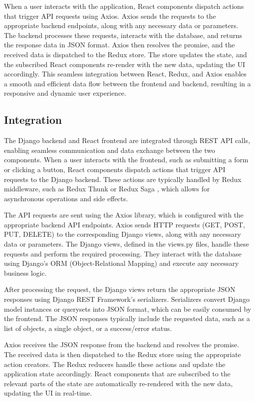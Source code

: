 \documentclass[conference]{IEEEtran}
\begin{document}
When a user interacts with the application, React components dispatch actions that trigger API requests using Axios. Axios sends the requests to the appropriate backend endpoints, along with any necessary data or parameters. The backend processes these requests, interacts with the database, and returns the response data in JSON format. Axios then resolves the promise, and the received data is dispatched to the Redux store. The store updates the state, and the subscribed React components re-render with the new data, updating the UI accordingly. This seamless integration between React, Redux, and Axios enables a smooth and efficient data flow between the frontend and backend, resulting in a responsive and dynamic user experience.

\subsection{Integration}
The Django backend and React frontend are integrated through REST API calls, enabling seamless communication and data exchange between the two components. When a user interacts with the frontend, such as submitting a form or clicking a button, React components dispatch actions that trigger API requests to the Django backend. These actions are typically handled by Redux middleware, such as Redux Thunk \cite{reduxthunk} or Redux Saga \cite{reduxsaga}, which allows for asynchronous operations and side effects.

The API requests are sent using the Axios library, which is configured with the appropriate backend API endpoints. Axios sends HTTP requests (GET, POST, PUT, DELETE) to the corresponding Django views, along with any necessary data or parameters. The Django views, defined in the views.py files, handle these requests and perform the required processing. They interact with the database using Django's ORM (Object-Relational Mapping) and execute any necessary business logic.

After processing the request, the Django views return the appropriate JSON responses using Django REST Framework's serializers. Serializers convert Django model instances or querysets into JSON format, which can be easily consumed by the frontend. The JSON responses typically include the requested data, such as a list of objects, a single object, or a success/error status.

Axios receives the JSON response from the backend and resolves the promise. The received data is then dispatched to the Redux store using the appropriate action creators. The Redux reducers handle these actions and update the application state accordingly. React components that are subscribed to the relevant parts of the state are automatically re-rendered with the new data, updating the UI in real-time.
\end{document}
